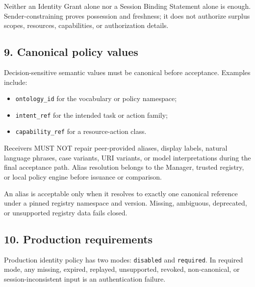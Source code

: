\documentclass[
]{article}
\providecommand{\tightlist}{%
  \setlength{\itemsep}{0pt}\setlength{\parskip}{0pt}}
\begin{document}
Neither an Identity Grant alone nor a Session Binding Statement alone is
enough. Sender-constraining proves possession and freshness; it does not
authorize surplus scopes, resources, capabilities, or authorization
details.

\subsection{9. Canonical policy values}\label{canonical-policy-values}

Decision-sensitive semantic values must be canonical before acceptance.
Examples include:

\begin{itemize}
\tightlist
\item
  \texttt{ontology\_id} for the vocabulary or policy namespace;
\item
  \texttt{intent\_ref} for the intended task or action family;
\item
  \texttt{capability\_ref} for a resource-action class.
\end{itemize}

Receivers MUST NOT repair peer-provided aliases, display labels, natural
language phrases, case variants, URI variants, or model interpretations
during the final acceptance path. Alias resolution belongs to the
Manager, trusted registry, or local policy engine before issuance or
comparison.

An alias is acceptable only when it resolves to exactly one canonical
reference under a pinned registry namespace and version. Missing,
ambiguous, deprecated, or unsupported registry data fails closed.

\subsection{10. Production requirements}\label{production-requirements}

Production identity policy has two modes: \texttt{disabled} and
\texttt{required}. In required mode, any missing, expired, replayed,
unsupported, revoked, non-canonical, or session-inconsistent input is an
authentication failure.
\end{document}
